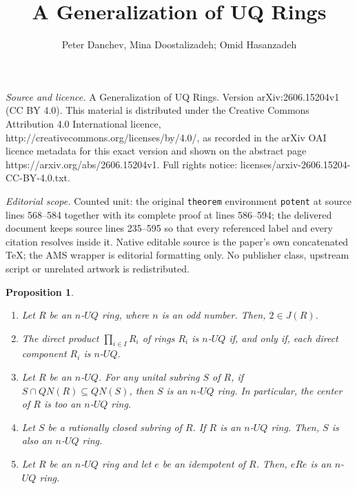 \documentclass[10pt,a4paper]{amsart}
\newtheorem{proposition}[theorem]{Proposition}
\begin{document}
\title[A Generalization of UQ Rings]{A Generalization of UQ Rings}
\author{Peter Danchev, Mina Doostalizadeh; Omid Hasanzadeh}
\date{}
\maketitle
\noindent\emph{Source and licence.} A Generalization of UQ Rings. Version arXiv:2606.15204v1 (CC BY 4.0). This material is distributed under the Creative Commons Attribution 4.0 International licence, http://creativecommons.org/licenses/by/4.0/, as recorded in the arXiv OAI licence metadata for this exact version and shown on the abstract page https://arxiv.org/abs/2606.15204v1. Full rights notice: licenses/arxiv-2606.15204-CC-BY-4.0.txt.\par\smallskip
\noindent\textit{Editorial scope.} Counted unit: the original \texttt{theorem} environment \texttt{potent} at source lines 568--584 together with its complete proof at lines 586--594; the delivered document keeps source lines 235--595 so that every referenced label and every citation resolves inside it. Native editable source is the paper's own concatenated TeX; the AMS wrapper is editorial formatting only. No publisher class, upstream script or unrelated artwork is redistributed.
\begin{proposition}\label{1.1}
\begin{enumerate}
\item
Let $R$ be an $n$-$UQ$ ring, where $n$ is an odd number. Then, $2\in J(R)$.
\item
The direct product \(\prod_{i \in I} R_i\) of rings $R_i$ is $n$-$UQ$ if, and only if, each direct component \(R_i\) is $n$-$UQ$.
\item
Let \(R\) be an $n$-$UQ$. For any unital subring \(S\) of \(R\), if \(S \cap QN(R) \subseteq QN(S)\), then \(S\) is an $n$-$UQ$ ring. In particular, the center of \(R\) is too an $n$-$UQ$ ring.
\item
Let $S$ be a rationally closed subring of $R$. If $R$ is an $n$-$UQ$ ring. Then, $S$ is also an $n$-$UQ$ ring.
\item
Let \(R\) be an $n$-$UQ$ ring and let \(e\) be an idempotent of \(R\). Then, \(eRe\) is an $n$-$UQ$ ring.
\end{enumerate}
\end{proposition}
\end{document}
